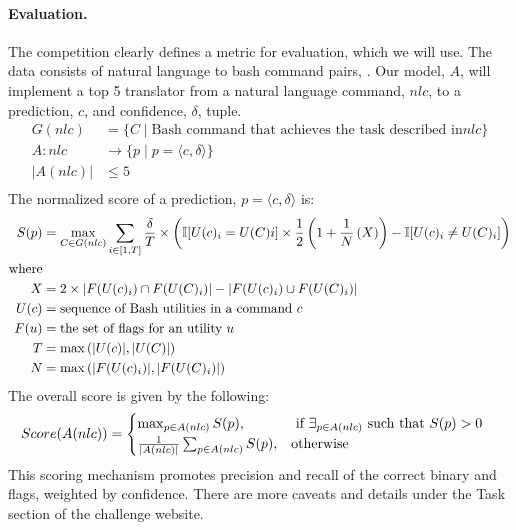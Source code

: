 \documentclass[12pt]{article}
\begin{document}
\paragraph{Evaluation.}
The competition clearly defines a metric for evaluation, which we will use. The
data consists of natural language to bash command pairs, . Our model, $A$,
will implement a top 5 translator from a natural language command, $nlc$, to a
prediction, $c$, and confidence, $\delta$, tuple.
\[
	\begin{aligned}
		G(nlc)
		 & =\{C\mid \text{Bash command that achieves the task described in} nlc\} \\
		A : nlc
		 & \rightarrow \{p \mid p = \langle c, \delta\rangle\}                    \\
		|A(nlc)|
		 & \le 5                                                                  \\
	\end{aligned}
\]
The normalized score of a prediction, $p=\langle c, \delta\rangle$ is:
\[
	\begin{aligned}
		S(p)
		 & = \max_{C\in G(nlc)}\sum_{i\in[1,T]}\frac{\delta}{T}\times\left(
		\mathbb{I}[U(c)_i=U(C)i]\times\frac{1}{2}\left(
			1+\frac{1}{N}\left(X\right)\right) -\mathbb{I}[U(c)_i\ne U(C)_i]
		\right)                                                                    \\
		\text{where}
		 &                                                                         \\
		X
		 & = 2\times \abs{F(U(c)_i)\cap F(U(C)_i)} - \abs{F(U(c)_i)\cup F(U(C)_i)} \\
		U(c)
		 & = \text{sequence of Bash utilities in a command $c$}                    \\
		F(u)
		 & = \text{the set of flags for an utility $u$}                            \\
		T
		 & = \max\left(\abs{U(c)}, \abs{U(C)}\right)                               \\
		N
		 & = \max\left(\abs{F(U(c)_i)}, \abs{F(U(C)_i)}\right)                     \\
	\end{aligned}
\]
The overall score is given by the following:
\[
	\begin{aligned}
		Score(A(nlc))
		 & =
		\begin{cases}
			\max_{p\in A(nlc)}S(p),
			 & \text{ if }\exists_{p\in A(nlc)}\text{ such that }S(p) > 0 \\
			\frac{1}{\abs{A(nlc)}}\sum_{p\in A(nlc)}S(p),
			 & \text{otherwise}                                           \\
		\end{cases}
	\end{aligned}
\]
This scoring mechanism promotes precision and recall of the correct binary and
flags, weighted by confidence. There are more caveats and details under the
Task section of the challenge website.
\end{document}
